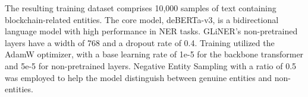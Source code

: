 \documentclass[runningheads]{llncs}
\begin{document}



The resulting training dataset comprises 10,000 samples of text containing blockchain-related entities. The core model, deBERTa-v3, is a bidirectional language model with high performance in NER tasks. GLiNER’s non-pretrained layers have a width of 768 and a dropout rate of 0.4. Training utilized the AdamW optimizer, with a base learning rate of 1e-5 for the backbone transformer and 5e-5 for non-pretrained layers. Negative Entity Sampling with a ratio of 0.5 was employed to help the model distinguish between genuine entities and non-entities.
\end{document}
